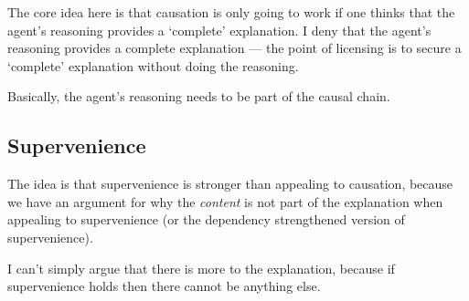 \documentclass[10pt]{article}
\begin{document}
The core idea here is that causation is only going to work if one thinks that the agent's reasoning provides a `complete' explanation.
I deny that the agent's reasoning provides a complete explanation --- the point of licensing is to secure a `complete' explanation without doing the reasoning.

Basically, the agent's reasoning needs to be part of the causal chain.

\subsection{Supervenience}
\label{sec:supervenience}

The idea is that supervenience is stronger than appealing to causation, because we have an argument for why the \emph{content} is not part of the explanation when appealing to supervenience (or the dependency strengthened version of supervenience).

I can't simply argue that there is more to the explanation, because if supervenience holds then there cannot be anything else.
\end{document}
